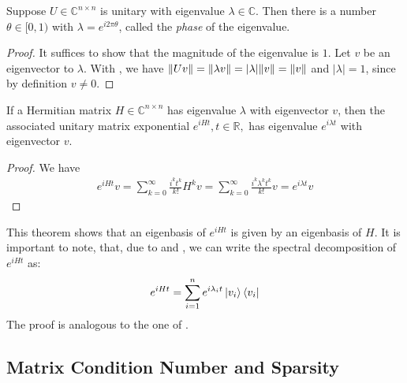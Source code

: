 \begin{theorem} \label{eigenvalue_phases}
    Suppose \(U \in \mathbb{C}^{n \times n}\) is unitary with eigenvalue \(\lambda \in \mathbb{C}\). Then there is a number \(\theta \in [0, 1)\) with \(\lambda = e^{i2\pi\theta}\), called the \emph{phase} of the eigenvalue.
\end{theorem}

\begin{proof}
    It suffices to show that the magnitude of the eigenvalue is \(1\). Let \(v\) be an eigenvector to \(\lambda\). With , we have \(\norm{Uv} = \norm{\lambda v} = |\lambda| \norm{v} = \norm{v}\) and \(|\lambda| = 1\), since by definition \(v \neq 0\).
\end{proof}

\begin{theorem} \label{exponential_eigenvalue_theorem}
    If a Hermitian matrix \(H \in \mathbb{C}^{n \times n}\) has eigenvalue \(\lambda\) with eigenvector \(v\), then the associated unitary matrix exponential \(e^{iHt}, t \in \mathbb{R},\) has eigenvalue \(e^{i \lambda t}\) with eigenvector \(v\).
\end{theorem}

\begin{proof}
    We have
    \begin{align}
        e^{iHt}v = \sum_{k=0}^\infty \frac{i^kt^k}{k!} H^k v = \sum_{k=0}^\infty \frac{i^k\lambda^kt^k}{k!}v = e^{i \lambda t} v
    \end{align}
\end{proof}

\begin{remark}
    This theorem shows that an eigenbasis of \(e^{iHt}\) is given by an eigenbasis of \(H\). It is important to note, that, due to  and , we can write the spectral decomposition of \(e^{iHt}\) as:
    \begin{align}
        e^{iHt} = \sum_{i=1}^n e^{i \lambda_i t} \ket{v_i}\bra{v_i}
    \end{align}
    The proof is analogous to the one of .
\end{remark}

\subsection{Matrix Condition Number and Sparsity }

